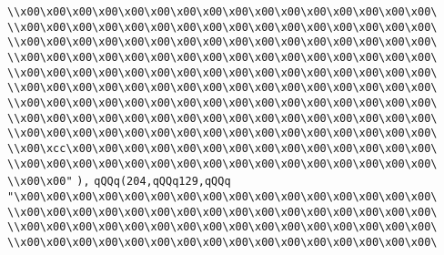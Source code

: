 \verb|\\x00\x00\x00\x00\x00\x00\x00\x00\x00\x00\x00\x00\x00\x00\x00\x00\|\newline
\verb|\\x00\x00\x00\x00\x00\x00\x00\x00\x00\x00\x00\x00\x00\x00\x00\x00\|\newline
\verb|\\x00\x00\x00\x00\x00\x00\x00\x00\x00\x00\x00\x00\x00\x00\x00\x00\|\newline
\verb|\\x00\x00\x00\x00\x00\x00\x00\x00\x00\x00\x00\x00\x00\x00\x00\x00\|\newline
\verb|\\x00\x00\x00\x00\x00\x00\x00\x00\x00\x00\x00\x00\x00\x00\x00\x00\|\newline
\verb|\\x00\x00\x00\x00\x00\x00\x00\x00\x00\x00\x00\x00\x00\x00\x00\x00\|\newline
\verb|\\x00\x00\x00\x00\x00\x00\x00\x00\x00\x00\x00\x00\x00\x00\x00\x00\|\newline
\verb|\\x00\x00\x00\x00\x00\x00\x00\x00\x00\x00\x00\x00\x00\x00\x00\x00\|\newline
\verb|\\x00\x00\x00\x00\x00\x00\x00\x00\x00\x00\x00\x00\x00\x00\x00\x00\|\newline
\verb|\\x00\xcc\x00\x00\x00\x00\x00\x00\x00\x00\x00\x00\x00\x00\x00\x00\|\newline
\verb|\\x00\x00\x00\x00\x00\x00\x00\x00\x00\x00\x00\x00\x00\x00\x00\x00\|\newline
\verb|\\x00\x00"|\newline
\verb|),|\newline
\verb|qQQq(204,qQQq129,qQQq|\newline
\verb|"\x00\x00\x00\x00\x00\x00\x00\x00\x00\x00\x00\x00\x00\x00\x00\x00\|\newline
\verb|\\x00\x00\x00\x00\x00\x00\x00\x00\x00\x00\x00\x00\x00\x00\x00\x00\|\newline
\verb|\\x00\x00\x00\x00\x00\x00\x00\x00\x00\x00\x00\x00\x00\x00\x00\x00\|\newline
\verb|\\x00\x00\x00\x00\x00\x00\x00\x00\x00\x00\x00\x00\x00\x00\x00\x00\|\newline
